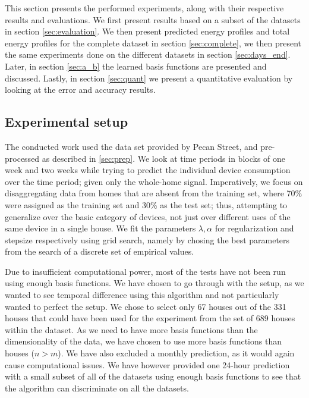 This section presents the performed experiments, along with their respective results and evaluations. We first present results based on a subset of the datasets in section \ref{sec:evaluation}. We then present predicted energy profiles and total energy profiles for the complete dataset in section \ref{sec:complete},  we then present the same experiments done on the different datasets in section \ref{sec:days_end}. Later, in section \ref{sec:a_b} the learned basis functions are presented and discussed. Lastly, in section \ref{sec:quant} we present a quantitative evaluation by looking at the error and accuracy results.

\subsection{Experimental setup}

The conducted work used the data set provided by Pecan Street, and pre-processed as described in \ref{sec:prep}. We look at time periods in blocks of one week and two weeks while trying to predict the individual device consumption over the time period; given only the whole-home signal. Imperatively, we focus on disaggregating data from homes that are absent from the training set, where 70\% were assigned as the training set and 30\% as the test set; thus, attempting to generalize over the basic category of devices, not just over different uses of the same device in a single house. We fit the parameters $\lambda,\alpha$ for regularization and stepsize  respectively using grid search, namely by chosing the best parameters from the search of a discrete set of empirical values.

Due to insufficient computational power, most of the tests have not been run using enough basis functions. We have chosen to go through with the setup, as we wanted to see temporal difference using this algorithm and not particularly wanted to perfect the setup. We chose to select only 67 houses out of the 331 houses that could have been used for the experiment from the set of 689 houses within the dataset. As we need to have more basis functions than the dimensionality of the data, we have chosen to use more basis functions than houses ($n > m$). We have also excluded a monthly prediction, as it would again cause computational issues. We have however provided one 24-hour prediction with a small subset of all of the datasets using enough basis functions to see that the algorithm can discriminate on all the datasets.

